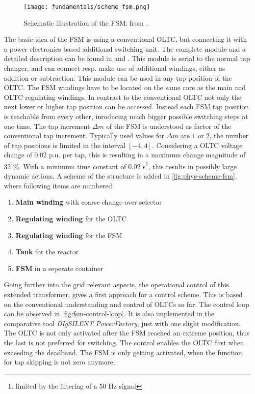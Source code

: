 \begin{figure} 
    \centering
    \texttt{[image: fundamentals/scheme\_fsm.png]}
    \caption[Schematic illustration of the \acs{FSM}]{Schematic illustration of the \acs{FSM}; from \autocite{burlakin_2024a}.}
    \label{fig:phys-scheme-fsm}
\end{figure}
The basic idea of the \acf{FSM} is using a conventional \acs{OLTC}, but connecting it with a power electronics based additional switching unit.
The complete module and a detailed description can be found in \autocite{burlakin_2024a} and \autocite{maschinenfabrikreinhausengmbh_2023}.
This module is serial to the normal tap changer, and can connect resp. make use of additional windings, either as addition or subtraction.
This module can be used in any tap position of the \acs{OLTC}.
The \acs{FSM} windings have to be located on the same core as the main and \acs{OLTC} regulating windings.
In contrast to the conventional \acs{OLTC} not only the next lower or higher tap position can be accessed.
Instead each \acs{FSM} tap position is reachable from every other, inroducing much bigger possible switching steps at one time.
The tap increment $\Delta m$ of the \acs{FSM} is understood as factor of the conventional tap increment.
Typically used values for $\Delta m$ are $1$ or $2$, the number of tap positions is limited in the interval $[-4,4]$.
Considering a \acs{OLTC} voltage change of $0.02$ p.u. per tap, this is resulting in a maximum change magnitude of $32$ \%.
With a minimum time constant of $0.02$ s\footnote{limited by the filtering of a $50$ Hz signal}, this results in possibly large dynamic actions.
A scheme of the structure is added in \autoref{fig:phys-scheme-fsm}, where following items are numbered:
\begin{enumerate}[label=\protect\circled{\arabic*}]
    \item \textbf{Main winding} with coarse change-over selector
    \item \textbf{Regulating winding} for the \acs{OLTC}
    \item \textbf{Regulating winding} for the \acs{FSM}
    \item \textbf{Tank} for the reactor
    \item \textbf{\acs{FSM}} in a seperate container
\end{enumerate}

Going further into the grid relevant aspects, the operational control of this extended transformer, \textcite{burlakin_2024} gives a first approach for a control scheme.
This is based on the conventional understanding and control of \acsp{OLTC} so far.
The control loop can be observed in \autoref{fig:fsm-control-loop}.
It is also implemented in the comparative tool \textit{DIgSILENT PowerFactory}, just with one slight modification.
The \acs{OLTC} is not only activated after the \acs{FSM} reached an extreme position, thus the last is not preferred for switching.
The control enables the \acs{OLTC} first when exceeding the deadband.
The \acs{FSM} is only getting activated, when the function for tap skipping is not zero anymore.

